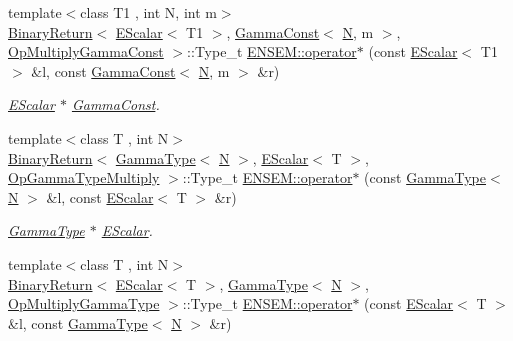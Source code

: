 \begin{DoxyCompactItemize}
{\footnotesize template$<$class T1 , int N, int m$>$ }\\\mbox{\hyperlink{structENSEM_1_1BinaryReturn}{Binary\+Return}}$<$ \mbox{\hyperlink{classENSEM_1_1EScalar}{E\+Scalar}}$<$ T1 $>$, \mbox{\hyperlink{classENSEM_1_1GammaConst}{Gamma\+Const}}$<$ \mbox{\hyperlink{adat__devel_2lib_2hadron_2operator__name__util_8cc_a7722c8ecbb62d99aee7ce68b1752f337}{N}}, m $>$, \mbox{\hyperlink{structENSEM_1_1OpMultiplyGammaConst}{Op\+Multiply\+Gamma\+Const}} $>$\+::Type\+\_\+t \mbox{\hyperlink{group__escalar_ga10de70ea3b5491035fab4f67de013321}{E\+N\+S\+E\+M\+::operator$\ast$}} (const \mbox{\hyperlink{classENSEM_1_1EScalar}{E\+Scalar}}$<$ T1 $>$ \&l, const \mbox{\hyperlink{classENSEM_1_1GammaConst}{Gamma\+Const}}$<$ \mbox{\hyperlink{adat__devel_2lib_2hadron_2operator__name__util_8cc_a7722c8ecbb62d99aee7ce68b1752f337}{N}}, m $>$ \&r)
\begin{DoxyCompactList}\small\item\em \mbox{\hyperlink{classENSEM_1_1EScalar}{E\+Scalar}} $\ast$ \mbox{\hyperlink{classENSEM_1_1GammaConst}{Gamma\+Const}}. \end{DoxyCompactList}\item 
{\footnotesize template$<$class T , int N$>$ }\\\mbox{\hyperlink{structENSEM_1_1BinaryReturn}{Binary\+Return}}$<$ \mbox{\hyperlink{classENSEM_1_1GammaType}{Gamma\+Type}}$<$ \mbox{\hyperlink{adat__devel_2lib_2hadron_2operator__name__util_8cc_a7722c8ecbb62d99aee7ce68b1752f337}{N}} $>$, \mbox{\hyperlink{classENSEM_1_1EScalar}{E\+Scalar}}$<$ T $>$, \mbox{\hyperlink{structENSEM_1_1OpGammaTypeMultiply}{Op\+Gamma\+Type\+Multiply}} $>$\+::Type\+\_\+t \mbox{\hyperlink{group__escalar_ga53bf11728d0f1f7fb9dea51cd221792d}{E\+N\+S\+E\+M\+::operator$\ast$}} (const \mbox{\hyperlink{classENSEM_1_1GammaType}{Gamma\+Type}}$<$ \mbox{\hyperlink{adat__devel_2lib_2hadron_2operator__name__util_8cc_a7722c8ecbb62d99aee7ce68b1752f337}{N}} $>$ \&l, const \mbox{\hyperlink{classENSEM_1_1EScalar}{E\+Scalar}}$<$ T $>$ \&r)
\begin{DoxyCompactList}\small\item\em \mbox{\hyperlink{classENSEM_1_1GammaType}{Gamma\+Type}} $\ast$ \mbox{\hyperlink{classENSEM_1_1EScalar}{E\+Scalar}}. \end{DoxyCompactList}\item 
{\footnotesize template$<$class T , int N$>$ }\\\mbox{\hyperlink{structENSEM_1_1BinaryReturn}{Binary\+Return}}$<$ \mbox{\hyperlink{classENSEM_1_1EScalar}{E\+Scalar}}$<$ T $>$, \mbox{\hyperlink{classENSEM_1_1GammaType}{Gamma\+Type}}$<$ \mbox{\hyperlink{adat__devel_2lib_2hadron_2operator__name__util_8cc_a7722c8ecbb62d99aee7ce68b1752f337}{N}} $>$, \mbox{\hyperlink{structENSEM_1_1OpMultiplyGammaType}{Op\+Multiply\+Gamma\+Type}} $>$\+::Type\+\_\+t \mbox{\hyperlink{group__escalar_gacd3a5ba72921d671ee94910188b8c179}{E\+N\+S\+E\+M\+::operator$\ast$}} (const \mbox{\hyperlink{classENSEM_1_1EScalar}{E\+Scalar}}$<$ T $>$ \&l, const \mbox{\hyperlink{classENSEM_1_1GammaType}{Gamma\+Type}}$<$ \mbox{\hyperlink{adat__devel_2lib_2hadron_2operator__name__util_8cc_a7722c8ecbb62d99aee7ce68b1752f337}{N}} $>$ \&r)

\end{DoxyCompactItemize}
